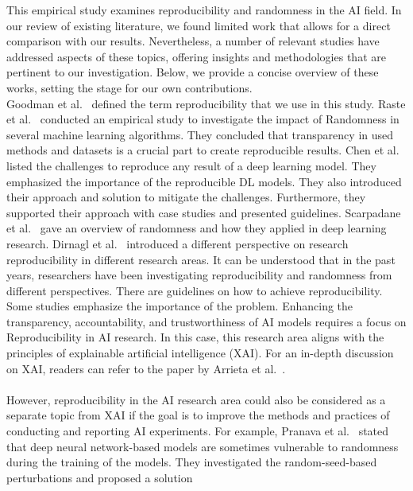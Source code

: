 
This empirical study examines reproducibility and randomness in the AI field. In our review of existing literature, we found limited work that allows for a direct comparison with our results. Nevertheless, a number of relevant studies have addressed aspects of these topics, offering insights and methodologies that are pertinent to our investigation. Below, we provide a concise overview of these works, setting the stage for our own contributions.\\

Goodman et al.~\cite{goodman:2016ca} defined the term reproducibility that we use in this study.
Raste et al.~\cite{Raste} conducted an empirical study to investigate the impact of Randomness 
in several machine learning algorithms. They concluded that transparency in used methods and
datasets is a crucial part to create reproducible results. Chen et al.~\cite{chenetal} listed the challenges 
to reproduce any result of a deep learning model. They emphasized the importance of the reproducible
DL models. They also introduced their approach and solution to mitigate the challenges.
Furthermore, they supported their approach with case studies and presented guidelines. Scarpadane et al.~\cite{scardapane2017randomness} gave an overview of randomness and how they applied in deep learning research.
Dirnagl et al.~\cite{dirnagl2019rethinking} introduced a different 
perspective on research reproducibility in different research areas.
It can be understood that in the past years,
researchers have been investigating reproducibility and randomness from different perspectives. 
There are guidelines on how to achieve reproducibility. Some studies emphasize the importance
of the problem. Enhancing the transparency, accountability, and trustworthiness of AI models requires a focus on Reproducibility in AI research. In this case, this research area aligns with the principles of explainable artificial intelligence (XAI). For an in-depth discussion on XAI, readers can refer to the paper by Arrieta et al.~\cite{arrieta2019explainable}.
\\
\\
However, reproducibility in the AI research area could also be considered as a separate topic from XAI 
if the goal is to improve the methods and practices of conducting and reporting AI 
experiments.
For example, Pranava et al.~\cite{madhyastha2019model}
stated that deep neural network-based models are sometimes vulnerable to randomness during the training
of the models. They investigated the random-seed-based perturbations and proposed a solution
